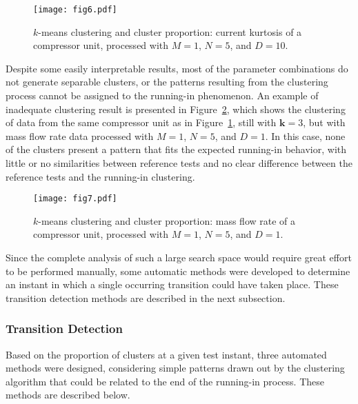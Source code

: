\documentclass[preprint,11pt,number]{elsarticle}
\begin{document}
\begin{figure}[htb]
\begin{center}
\texttt{[image: fig6.pdf]}    %
\caption{$k$-means clustering and cluster proportion: current kurtosis of a compressor unit, processed  with $M = 1$, $N = 5$, and $D = 10$.}
\label{fig:amaciamentoClustersBom}
\end{center}
\end{figure}

Despite some easily interpretable results, most of the parameter combinations do not generate separable clusters, or the patterns resulting from the clustering process cannot be assigned to the running-in phenomenon. An example of inadequate clustering result is presented in Figure~\ref{fig:amaciamentoClustersRuim}, which shows the clustering of data from the same compressor unit as in Figure~\ref{fig:amaciamentoClustersBom}, still with $\bm{k} = 3$, but with mass flow rate data processed with $M = 1$, $N = 5$, and $D = 1$. In this case, none of the clusters present a pattern that fits the expected running-in behavior, with little or no similarities between reference tests and no clear difference between the reference tests and the running-in clustering.

\begin{figure}[htb]
\begin{center}
\texttt{[image: fig7.pdf]}    %
\caption{$k$-means clustering and cluster proportion: mass flow rate of a compressor unit, processed  with $M = 1$, $N = 5$, and $D = 1$.}
\label{fig:amaciamentoClustersRuim}
\end{center}
\end{figure}

Since the complete analysis of such a large search space would require great effort to be performed manually, some automatic methods were developed to determine an instant in which a single occurring transition could have taken place. These transition detection methods are described in the next subsection.

\subsubsection{Transition Detection}\label{subsubsec:DetectionMethods}

Based on the proportion of clusters at a given test instant, three automated methods were designed, considering simple patterns drawn out by the clustering algorithm that could be related to the end of the running-in process. These methods are described below.
\end{document}
